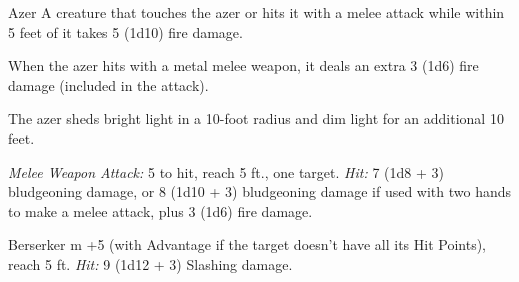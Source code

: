 \documentclass[10pt,a4paper,twoside,bg=print,twocolumn,openany,nodeprecatedcode]{dndarticle}
\begin{document}
\begin{DndMonster}[float=t]{Azer}
\DndMonsterBasics[
armor-class = {17 (natural armor)},
hit-points = {\DndDice{6d8 + 12}},
speed = {30 ft.}
]
\DndMonsterAbilityScores[
 str = 17,
 dex = 12,
 con = 15,
 int = 12,
 wis = 13,
 cha = 10
]
\DndMonsterDetails[
saving-throws = {Con +4},
damage-immunities = {fire, poison},
condition-immunities = {poisoned},
languages = {Ignan},
challenge = 2,
]
A creature that touches the azer or hits it with a melee attack while within 5 feet of it takes 5 (1d10) fire damage.

When the azer hits with a metal melee weapon, it deals an extra 3 (1d6) fire damage (included in the attack).

The azer sheds bright light in a 10-foot radius and dim light for an additional 10 feet.

\textsl{Melee Weapon Attack:} 5 to hit, reach 5 ft., one target. \textsl{Hit:} 7 (1d8 + 3) bludgeoning damage, or 8 (1d10 + 3) bludgeoning damage if used with two hands to make a melee attack, plus 3 (1d6) fire damage.

\end{DndMonster}



\begin{DndMonster}[float=t]{Berserker}
\DndMonsterBasics[
armor-class = {13},
hit-points = {\DndDice{9d8 + 27}},
speed = {30 ft.}
]
\DndMonsterAbilityScores[
 str = 16,
 dex = 12,
 con = 17,
 int = 9,
 wis = 11,
 cha = 9
]
\DndMonsterDetails[
languages = {Common},
challenge = 2,
]
m +5 (with Advantage if the target doesn't have all its Hit Points), reach 5 ft. \textsl{Hit:} 9 (1d12 + 3) Slashing damage.

\end{DndMonster}
\end{document}
